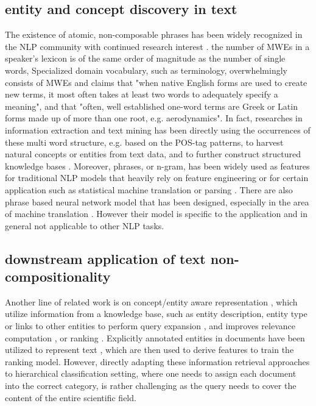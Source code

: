 \subsection{entity and concept discovery in text}
The existence of atomic, non-composable phrases has been widely recognized in the NLP community with continued research interest \cite{sag2002multiword, baldwin2010multiword, constant2017multiword, hashimoto2016adaptive}. \cite{jackendoff1997architecture}
the number of MWEs in a speaker's lexicon is of the same order of magnitude as the number of single words,
Specialized domain vocabulary, such as terminology, overwhelmingly consists of MWEs
and \cite{justeson1995technical} claims that 
"when native English forms are used to create new terms, it most often takes at least two words to adequately specify a meaning", and that "often, well established one-word terms are Greek or Latin forms made up of more than one root, e.g. aerodynamics".
In fact, researches in information extraction and text mining has been directly using the occurrences of these multi word structure, e.g. based on the POS-tag patterns, to harvest natural concepts or entities from text data, and to further construct structured knowledge bases \cite{banko2007open, wu2012probase, ren2016automatic}. 
Moreover, phrases, or n-gram, has been widely used as features for traditional NLP models that heavily rely on feature engineering \cite{furnkranz1998study} or for certain application such as statistical machine translation or parsing \cite{koehn2009statistical, cafferkey2007multi, savary2015parseme}. There are also phrase based neural network model that has been designed, especially in the area of machine translation \cite{cho2014learning, huang2017neural}. However their model is specific to the application and in general not applicable to other NLP tasks.

\subsection{downstream application of text non-compositionality}
Another line of related work is on 
concept/entity aware representation
, which utilize information from a knowledge base, such as entity description, entity type or links to other entities to perform query expansion \cite{xiong2015query, dalton2014entity}, 
and improves relevance computation \cite{shen2018entity}, or ranking \cite{xiong2015esdrank} .
Explicitly annotated entities in documents have been utilized to represent text \cite{xiong2017explicit, xiong2017word}, which are then used to derive features to train the ranking model. However, directly adapting these information retrieval approaches to hierarchical classification setting, where one needs to assign each document into the correct category, is rather challenging as the query needs to cover the content of the entire scientific field.

